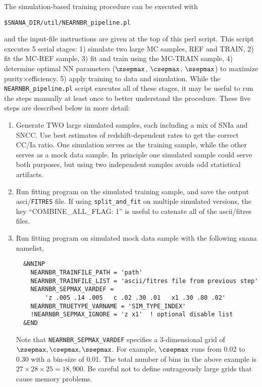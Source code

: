 \documentclass[12pt]{article}
\begin{document}
The simulation-based training procedure 
can be executed with 
\begin{Verbatim}[frame=single]
    $SNANA_DIR/util/NEARNBR_pipeline.pl
\end{Verbatim}
and the input-file instructions are given at the top
of this perl script. This script executes 5 serial stages:
1) simulate two large MC samples, REF and TRAIN,
2) fit the MC-REF sample, 
3) fit and train using the MC-TRAIN sample,
4) determine optimal NN parameters ($\zsepmax$, $\csepmax$, $\ssepmax$)
 to maximize purity$\times$efficiency.
5) apply training to data and simulation.
While the {\tt NEARNBR\_pipeline.pl} script executes
all of these stages, it may be useful to run the steps
manually at least once to better understand the procedure.
These five steps are described below in more detail:
%
\begin{enumerate}
  \item Generate TWO large simulated samples, each including
        a mix of SNIa and SNCC.
        Use best estimates of redshift-dependent rates to get the
        correct CC/Ia ratio. One simulation serves as the
	training sample, while the other serves as a mock data sample.
	In principle one simulated sample could serve both purposes,
	but using two independent samples avoids odd statistical
	artifacts.
%
 \item  Run fitting program on the simulated training sample,
        and save the output asci/{\tt FITRES} file. If using
	{\tt split\_and\_fit} on multiple simulated versions,
	the key ``{COMBINE\_ALL\_FLAG: 1}'' is useful to 
	catenate all of the ascii/fitres files.
%
 \item  Run fitting program on simulated mock data sample with the
        following snana namelist,
     \begin{verbatim}
  &NNINP 
    NEARNBR_TRAINFILE_PATH = 'path'
    NEARNBR_TRAINFILE_LIST = 'ascii/fitres file from previous step'
    NEARNBR_SEPMAX_VARDEF = 
        'z .005 .14 .005   c .02 .30 .01   x1 .30 .80 .02'
    NEARNBR_TRUETYPE_VARNAME = 'SIM_TYPE_INDEX'
    !NEARNBR_SEPMAX_IGNORE = 'z x1'  ! optional disable list
  &END
     \end{verbatim}
       Note that {\tt NEARNBR\_SEPMAX\_VARDEF} specifies a 3-dimensional
       grid of $\zsepmax,\csepmax,\ssepmax$. For example, $\csepmax$
       runs from 0.02 to 0.30 with a bin-size of 0.01. The total
       number of bins in the above example is 
       $27\times 28 \times 25 = 18,900$. Be careful not to define
       outrageously large grids that cause memory problems.

\end{enumerate}
\end{document}
